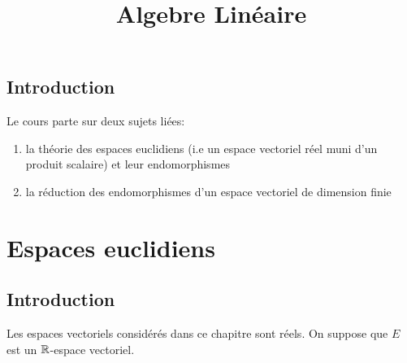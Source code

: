 \documentclass[a4paper]{report}
\title{Algebre Linéaire}
\begin{document}
\maketitle
\section{Introduction}
Le cours parte sur deux sujets liées:
\begin{enumerate}
    \item la théorie des espaces euclidiens (i.e un espace vectoriel réel muni d'un produit scalaire) et leur endomorphismes
    \item la réduction des endomorphismes d'un espace vectoriel de dimension finie
\end{enumerate}

\chapter{Espaces euclidiens}
\section{Introduction}
Les espaces vectoriels considérés dans ce chapitre sont réels. On suppose que $E$ est un $\mathbb{R}$-espace vectoriel.
\end{document}
